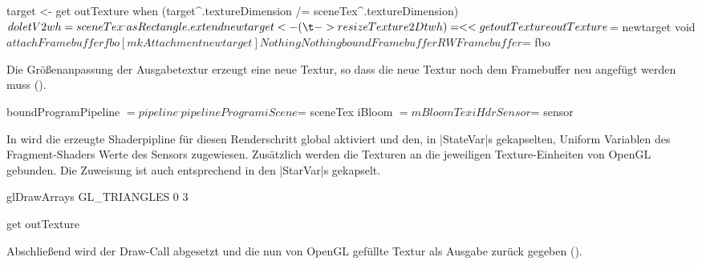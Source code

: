 \begin{haskell}[label={lst:tonemap-pass-run-resize},caption={[ToneMapPass Größenanpassung des Framebuffers]\texttt{ToneMapPass} Größenanpassung des Framebuffers},nolol]
    target <- get outTexture
    when (target^.textureDimension /= sceneTex^.textureDimension) $ do
      let V2 w h = sceneTex^.asRectangle.extend
      newtarget <- (\t -> resizeTexture2D t w h) =<< get outTexture
      outTexture $= newtarget
      void $ attachFramebuffer fbo [mkAttachment newtarget] Nothing Nothing
    boundFramebuffer RWFramebuffer $= fbo
\end{haskell}

Die Größenanpassung der Ausgabetextur erzeugt eine neue Textur, so dass die neue Textur noch dem Framebuffer neu angefügt werden muss ().

\begin{haskell}[label={lst:tonemap-pass-run-pipeline},caption={\texttt{ToneMapPass} Zuweisung an Uniform Variablen},nolol]
    boundProgramPipeline $= pipeline^.pipelineProgram

    iScene $= sceneTex
    iBloom $= mBloomTex
    iHdrSensor $= sensor
\end{haskell}

In  wird die erzeugte Shaderpipline für diesen Renderschritt global aktiviert und den, in |StateVar|s gekapselten, Uniform Variablen des Fragment-Shaders Werte des Sensors zugewiesen. Zusätzlich werden die Texturen an die jeweiligen Texture-Einheiten von OpenGL gebunden. Die Zuweisung ist auch entsprechend in den |StarVar|s gekapselt.

\begin{haskell}[label={lst:tonemap-pass-run-draw-and-out},caption={\texttt{ToneMapPass} Draw-Call und Textur ausgeben},nolol]
    glDrawArrays GL_TRIANGLES 0 3

    get outTexture
\end{haskell}

Abschließend wird der Draw-Call abgesetzt und die nun von OpenGL gefüllte Textur als Ausgabe zurück gegeben ().
